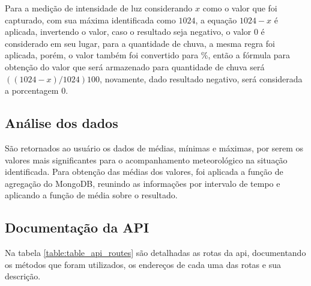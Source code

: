 Para a medição de intensidade de luz considerando $x$ como o valor que foi capturado, com sua máxima identificada como $1024$, a equação $1024 - x$ é aplicada, invertendo o valor, caso o resultado seja negativo, o valor $0$ é considerado em seu lugar, para a quantidade de chuva, a mesma regra foi aplicada, porém, o valor também foi convertido para \%, então a fórmula para obtenção do valor que será armazenado para quantidade de chuva será $((1024-x)/1024)100$, novamente, dado resultado negativo, será considerada a porcentagem $0$.

\subsection{Análise dos dados}

São retornados ao usuário os dados de médias, mínimas e máximas, por serem os valores mais significantes para o acompanhamento meteorológico na situação identificada.
Para obtenção das médias dos valores, foi aplicada a função de agregação do MongoDB, reunindo as informações por intervalo de tempo e aplicando a função de média sobre o resultado.

\subsection{Documentação da API}
\label{sec:doc_api}

Na tabela \ref{table:table_api_routes} são detalhadas as rotas da api, documentando os métodos que foram utilizados, os endereços de cada uma das rotas e sua descrição.

